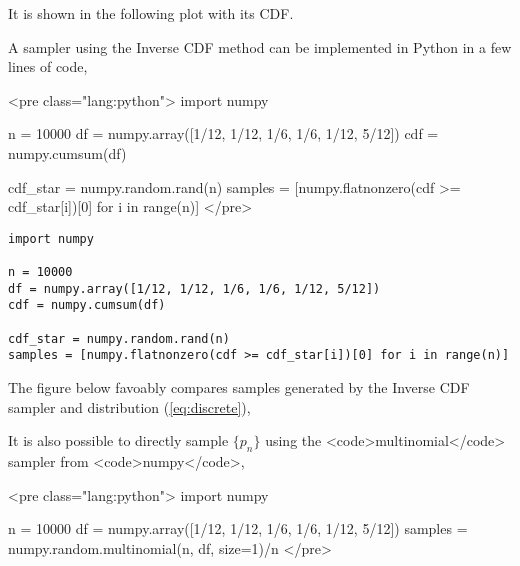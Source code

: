 \documentclass[12pt]{article}
\begin{document}
It is shown in the following plot with its CDF.

\ifblog
{}
\fi
\iftex
{}
\fi


A sampler using the Inverse CDF method can be implemented in Python in a few lines of code,

\ifblog
<pre class="lang:python">
import numpy

n = 10000
df = numpy.array([1/12, 1/12, 1/6, 1/6, 1/12, 5/12])
cdf = numpy.cumsum(df)

cdf_star = numpy.random.rand(n)
samples = [numpy.flatnonzero(cdf >= cdf_star[i])[0] for i in range(n)]
</pre>
\fi

\iftex
\begin{verbatim}
import numpy

n = 10000
df = numpy.array([1/12, 1/12, 1/6, 1/6, 1/12, 5/12])
cdf = numpy.cumsum(df)

cdf_star = numpy.random.rand(n)
samples = [numpy.flatnonzero(cdf >= cdf_star[i])[0] for i in range(n)]
\end{verbatim}
\fi

The figure below favoably compares samples generated by the Inverse CDF sampler and distribution (\ref{eq:discrete}),
\ifblog
{}
\fi
\iftex
{}
\fi


\ifblog
It is also possible to directly sample $\{p_n\}$ using the <code>multinomial</code> sampler from
<code>numpy</code>,

<pre class="lang:python">
import numpy

n = 10000
df = numpy.array([1/12, 1/12, 1/6, 1/6, 1/12, 5/12])
samples = numpy.random.multinomial(n, df, size=1)/n
</pre>
\fi
\end{document}
